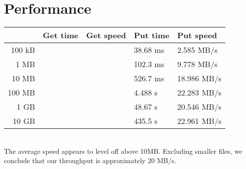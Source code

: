 \documentclass[10pt]{article}
\begin{document}
\section{Performance}

\begin{tabular}{r|ll|ll}
        & Get time & Get speed & Put time & Put speed \\ \hline
 100 kB & & & 38.68 ms &  2.585 MB/s \\
   1 MB & & & 102.3 ms &  9.778 MB/s \\
  10 MB & & & 526.7 ms & 18.986 MB/s \\
 100 MB & & & 4.488 s  & 22.283 MB/s \\
   1 GB & & & 48.67 s  & 20.546 MB/s \\
  10 GB & & & 435.5 s  & 22.961 MB/s
\end{tabular}\\[5pt]

The average speed appears to level off above 10MB.
Excluding smaller files, we conclude that our throughput is approximately 20 MB/s.
\end{document}
